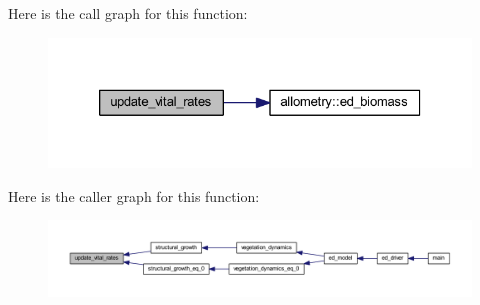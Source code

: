 Here is the call graph for this function\+:\nopagebreak
\begin{figure}[H]
\begin{center}
\leavevmode
\includegraphics[width=326pt]{structural__growth_8f90_a18746b03d74909fea238e464b0f7f513_cgraph}
\end{center}
\end{figure}




Here is the caller graph for this function\+:\nopagebreak
\begin{figure}[H]
\begin{center}
\leavevmode
\includegraphics[width=350pt]{structural__growth_8f90_a18746b03d74909fea238e464b0f7f513_icgraph}
\end{center}
\end{figure}


